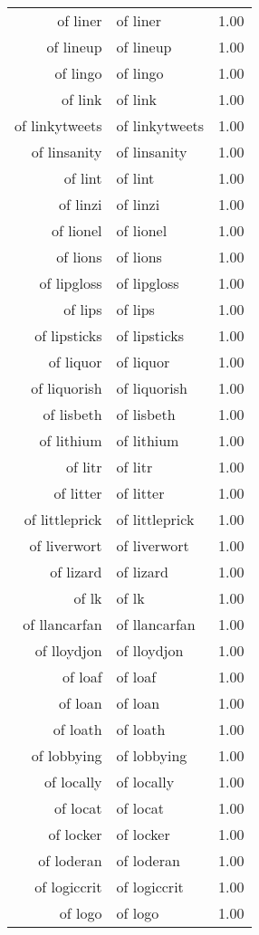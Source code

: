 \begin{table}[ht]
\begin{tabular}{rlr}
  of liner & of liner & 1.00 \\ 
  of lineup & of lineup & 1.00 \\ 
  of lingo & of lingo & 1.00 \\ 
  of link & of link & 1.00 \\ 
  of linkytweets & of linkytweets & 1.00 \\ 
  of linsanity & of linsanity & 1.00 \\ 
  of lint & of lint & 1.00 \\ 
  of linzi & of linzi & 1.00 \\ 
  of lionel & of lionel & 1.00 \\ 
  of lions & of lions & 1.00 \\ 
  of lipgloss & of lipgloss & 1.00 \\ 
  of lips & of lips & 1.00 \\ 
  of lipsticks & of lipsticks & 1.00 \\ 
  of liquor & of liquor & 1.00 \\ 
  of liquorish & of liquorish & 1.00 \\ 
  of lisbeth & of lisbeth & 1.00 \\ 
  of lithium & of lithium & 1.00 \\ 
  of litr & of litr & 1.00 \\ 
  of litter & of litter & 1.00 \\ 
  of littleprick & of littleprick & 1.00 \\ 
  of liverwort & of liverwort & 1.00 \\ 
  of lizard & of lizard & 1.00 \\ 
  of lk & of lk & 1.00 \\ 
  of llancarfan & of llancarfan & 1.00 \\ 
  of lloydjon & of lloydjon & 1.00 \\ 
  of loaf & of loaf & 1.00 \\ 
  of loan & of loan & 1.00 \\ 
  of loath & of loath & 1.00 \\ 
  of lobbying & of lobbying & 1.00 \\ 
  of locally & of locally & 1.00 \\ 
  of locat & of locat & 1.00 \\ 
  of locker & of locker & 1.00 \\ 
  of loderan & of loderan & 1.00 \\ 
  of logiccrit & of logiccrit & 1.00 \\ 
  of logo & of logo & 1.00 \\ 

\end{tabular}
\end{table}
